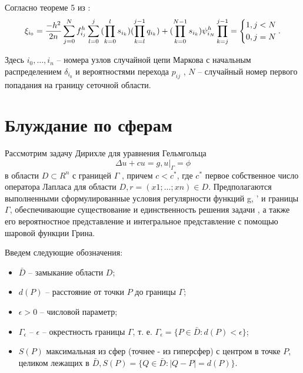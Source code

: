 Согласно теореме 5 из \cite{luk:dis}:
\begin{equation}
	\xi_{i_{0}}=\frac{-h^{2}}{2n}\sum^{N}_{j=0}{f^{h}_{i_{j}}}\sum^{j}_{l=0}{(\prod^{l}_{k=0}{s_{i_{k}}})(\prod^{j-1}_{k=l}{q_{i_{k}}})+(\prod^{N-1}_{k=0}{s_{i_{k}}})\psi^{h}_{i_{N}}}\\
	\prod^{j-1}_{k=j}=\left\{
\begin{aligned}
& 1, j<N\\ & 0, j=N
\end{aligned}
 \right. .
\end{equation}

Здесь $i_{0},\dots,i_{n}$ -- номера узлов случайной цепи Маркова с начальным
распределением $\delta_{i_{0}} $ и вероятностями перехода $p_{ij}$ , $N$ -- случайный номер
первого попадания на границу сеточной области.
\section{Блуждание по сферам}
Рассмотрим задачу Дирихле для уравнения Гельмгольца
\begin{equation} \Delta u + cu = g,	 u|_{\Gamma} = \phi \end{equation}
в области $D \subset R^{n}$ с границей $\Gamma$ , причем $c < c^{*}$, где $c^{*}$ первое собственное число оператора Лапласа для области $D, r = (x1;\dots; xn) \in D$. Предполагаются выполненными сформулированные условия регулярности функций g, ' и границы $\Gamma$, обеспечивающие существование и единственность решения задачи , а также его вероятностное представление и интегральное представление с помощью шаровой функции Грина.

Введем следующие обозначения:
\begin{itemize}
	\item $\bar{D}$  -- замыкание области $D$;
	\item $d(P)$ -- расстояние от точки $P$ до границы $\Gamma$;
	\item $\epsilon > 0 $ -- числовой параметр;
	\item $\Gamma_{\epsilon }$ -- $\epsilon$ -- окрестность границы $\Gamma$, т. е. $ \Gamma_{\epsilon }=\{ P \in \bar{D}:d(P) < \epsilon \} $;
	\item $S(P)$  максимальная из сфер (точнее - из гиперсфер) с центром в точке $P$, целиком лежащих в $\bar{D}, S(P) = \{Q \in \bar{D}: |Q - P| = d(P)\}$.
\end{itemize}

